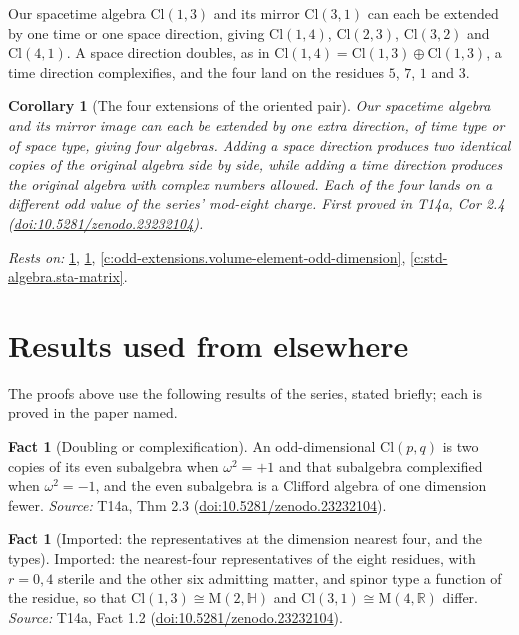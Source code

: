 \documentclass[11pt]{article}
\newtheorem{corollary}[theorem]{Corollary}
\theoremstyle{definition}
\newtheorem{fact}[theorem]{Fact}
\theoremstyle{plain}
\providecommand{\Cl}{}\renewcommand{\Cl}{\mathrm{Cl}}
\providecommand{\HH}{}\renewcommand{\HH}{\mathbb{H}}
\providecommand{\Mat}{}\renewcommand{\Mat}{\mathrm{M}}
\providecommand{\R}{}\renewcommand{\R}{\mathbb{R}}
\begin{document}
Our spacetime algebra $\Cl(1,3)$ and its mirror $\Cl(3,1)$ can each be extended by one time or one space direction, giving $\Cl(1,4)$, $\Cl(2,3)$, $\Cl(3,2)$ and $\Cl(4,1)$. A space direction doubles, as in $\Cl(1,4) = \Cl(1,3) \oplus \Cl(1,3)$, a time direction complexifies, and the four land on the residues $5$, $7$, $1$ and $3$.

\begin{corollary}[The four extensions of the oriented pair]\label{c:odd-extensions.four-extensions-oriented-pair}
Our spacetime algebra and its mirror image can each be extended by one extra direction, of time type or of space type, giving four algebras. Adding a space direction produces two identical copies of the original algebra side by side, while adding a time direction produces the original algebra with complex numbers allowed. Each of the four lands on a different odd value of the series' mod-eight charge.
\emph{First proved in} T14a, Cor 2.4 (\href{https://doi.org/10.5281/zenodo.23232104}{doi:10.5281/zenodo.23232104}).
\end{corollary}
\noindent\emph{Rests on:} \ref{c:odd-extensions.doubling-or-complexification}, \ref{c:odd-extensions.imported-representatives-dimension-nearest-four-types}, \ref{c:odd-extensions.volume-element-odd-dimension}, \ref{c:std-algebra.sta-matrix}.

\section{Results used from elsewhere}
The proofs above use the following results of the series, stated briefly; each is proved in the paper named.

\begin{fact}[Doubling or complexification]\label{c:odd-extensions.doubling-or-complexification}
An odd-dimensional $\Cl(p,q)$ is two copies of its even subalgebra when $\omega^{2} = +1$ and that subalgebra complexified when $\omega^{2} = -1$, and the even subalgebra is a Clifford algebra of one dimension fewer.
\emph{Source:} T14a, Thm 2.3 (\href{https://doi.org/10.5281/zenodo.23232104}{doi:10.5281/zenodo.23232104}).
\end{fact}

\begin{fact}[Imported: the representatives at the dimension nearest four, and the types]\label{c:odd-extensions.imported-representatives-dimension-nearest-four-types}
Imported: the nearest-four representatives of the eight residues, with $r = 0, 4$ sterile and the other six admitting matter, and spinor type a function of the residue, so that $\Cl(1,3) \cong \Mat(2,\HH)$ and $\Cl(3,1) \cong \Mat(4,\R)$ differ.
\emph{Source:} T14a, Fact 1.2 (\href{https://doi.org/10.5281/zenodo.23232104}{doi:10.5281/zenodo.23232104}).
\end{fact}
\end{document}

